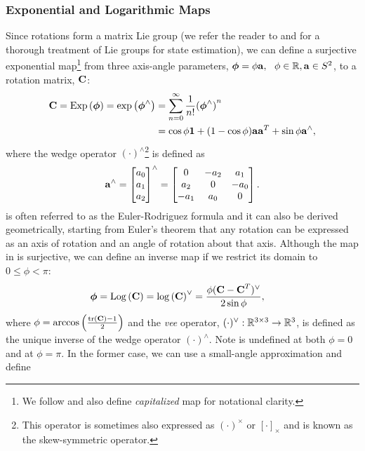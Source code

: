 \subsubsection{Exponential and Logarithmic Maps}

Since rotations form a matrix Lie group (we refer the reader to \cite{Sola2018-kg} and \cite{Barfoot2017-ri} for a thorough treatment of Lie groups for state estimation), we can define a surjective exponential map\footnote{We follow \cite{Sola2018-kg} and also define \textit{capitalized} map for notational clarity.} from three axis-angle parameters, $\boldsymbol{\mathbf{\phi}} = \phi \boldsymbol{\mathbf{a}}, ~~ \phi \in \mathbb{R}{}, \boldsymbol{\mathbf{a}} \in S^2$, to a rotation matrix, $\boldsymbol{\mathbf{C}}$: 
\begin{align}
\label{eq:so3_exp}
\boldsymbol{\mathbf{C}} = \mathrm{Exp}\left({\boldsymbol{\mathbf{\phi}}}\right) = \mathrm{exp}\left({\boldsymbol{\mathbf{\phi}}}^{\wedge}\right) &= \sum_{n=0}^{\infty}  \frac{1}{n!} {(\boldsymbol{\mathbf{\phi}}^\wedge)}^n\\
\label{eq:euler_rodriguez}
&= \cos{\phi} \boldsymbol{\mathbf{1}} + (1 - \cos{\phi}) \boldsymbol{\mathbf{a}}\boldsymbol{\mathbf{a}}^T + \sin{\phi} \boldsymbol{\mathbf{a}}^\wedge,
\end{align}
where the wedge operator $(\cdot)^\wedge$\footnote{This operator is sometimes also expressed as $(\cdot)^\times$ or $[\cdot]_\times$ and is known as the skew-symmetric operator.} is defined as
\begin{equation}
\boldsymbol{\mathbf{a}}^\wedge = \begin{bmatrix} a_0 \\ a_1 \\ a_2 \end{bmatrix}^\wedge = \begin{bmatrix} 0 & -a_2 & a_1 \\ a_2 & 0 & -a_0 \\ -a_1 & a_0 & 0 \end{bmatrix}.	
\end{equation}
 is often referred to as the Euler-Rodriguez formula and it can also be derived geometrically, starting from Euler's theorem that any rotation can be expressed as an axis of rotation and an angle of rotation about that axis. Although  the map in  is surjective, we can define an inverse map if we restrict its domain to $0 \leq \phi < \pi$:
\begin{align}
\label{eq:so3_log}
\boldsymbol{\mathbf{\phi}} =  \mathrm{Log}\left({\boldsymbol{\mathbf{C}}}\right) = \mathrm{log}\left({\boldsymbol{\mathbf{C}}}\right)^{\vee} &= \frac{\phi (\boldsymbol{\mathbf{C}} - \boldsymbol{\mathbf{C}}^T)^\vee}{2 \sin{\phi}}, 
\end{align}
where $\phi = \arccos{\left(\frac{ \mathrm{tr}\left(  \boldsymbol{\mathbf{C}}  \right)  - 1}{2}\right)}$ and the \textit{vee} operator, $(\cdot)^\vee : \mathbb{R}{}^{3 \times 3} \rightarrow \mathbb{R}{}^3$, is defined as the unique inverse of the wedge operator $(\cdot)^\wedge$. Note  is undefined at both $\phi = 0$ and at $\phi = \pi$. In the former case, we can use a small-angle approximation and define

